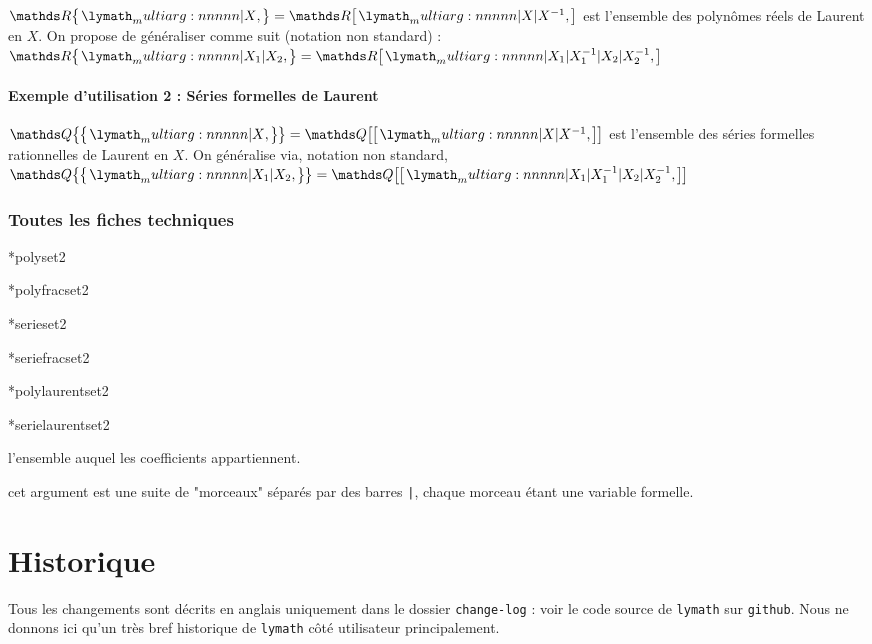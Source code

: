 \documentclass[12pt,a4paper]{scrartcl}
\makeatletter
\theoremstyle{definition}
\newcommand\IDmacro{\@ifstar{\@IDmacro@star}{\@IDmacro@no@star}}
\newcommand\@IDmacro@no@star[3]{%
    \texttt{%
    	\textbackslash#1%
    	\IfStrEq{#2}{0}{}{%
    		\,\,[#2 Option%
				\IfStrEq{#2}{1}{}{s}]%
			}%
	    \IfStrEq{#3}{}{}{%
	    		\,\,(#3 Argument%
				\IfStrEq{#3}{1}{}{s})%
			}
	   	}
    \immediate\write\tempfile{macro,#1,#2,#3}%
}
\newcommand\@IDmacro@star[2]{%
    \@IDmacro@no@star{#1}{0}{#2}%
}
\newcommand\@IDoptarg{\@ifstar{\@IDoptarg@star}{\@IDoptarg@no@star}}
\newcommand\@IDoptarg@star[2]{%
	\vspace{0.5em}
	\textbf{---} \texttt{#1%
		\IfStrEq{#2}{}{:}{\,#2:}%
	}%
}
\newcommand\@IDoptarg@no@star[2]{%
	\IfStrEq{#2}{}{%
		\@IDoptarg@star{#1}{}%
	}{%
		\@IDoptarg@star{#1}{#2}%
	}%
}
\newcommand\IDarg[1]{%
	\@IDoptarg{Argument}{#1}%
}
\makeatother
\begin{document}
\begin{tcblisting}{}
$\polylaurentset{\RR}{X} = \polyset{\RR}{X | X^{-1}}$ est l'ensemble des polynômes
réels de Laurent en $X$. On propose de généraliser comme suit (notation non standard) :
$\polylaurentset{\RR}{X_1 | X_2} = \polyset{\RR}{X_1 | X_1^{-1} | X_2 | X_2^{-1}}$
\end{tcblisting}



            \paragraph{Exemple d'utilisation 2 : Séries formelles de Laurent}

\begin{tcblisting}{}
$\serielaurentset{\QQ}{X} = \serieset{\QQ}{X | X^{-1}}$ est l'ensemble des séries 
formelles rationnelles de Laurent en $X$. On généralise via, notation non standard,
$\serielaurentset{\QQ}{X_1 | X_2} = \serieset{\QQ}{X_1 | X_1^{-1} | X_2 | X_2^{-1}}$
\end{tcblisting}



        \subsubsection{Toutes les fiches techniques}

\IDmacro*{polyset}{2}

\IDmacro*{polyfracset}{2}

\IDmacro*{serieset}{2}

\IDmacro*{seriefracset}{2}

\IDmacro*{polylaurentset}{2}

\IDmacro*{serielaurentset}{2}

\IDarg{1} l'ensemble auquel les coefficients appartiennent.

\IDarg{2} cet argument est une suite de "morceaux" séparés par des barres \verb+|+, chaque morceau étant une variable formelle.




\newpage

\section{Historique}

Tous les changements sont décrits en anglais uniquement dans le dossier \verb+change-log+ : voir le code source de \verb+lymath+ sur \verb+github+. Nous ne donnons ici qu'un très bref historique de \verb+lymath+ côté utilisateur principalement.
\end{document}
